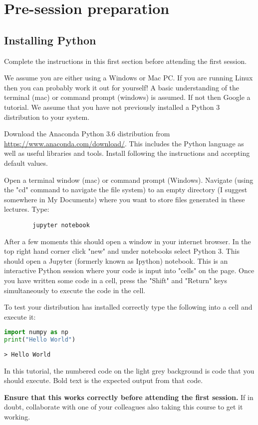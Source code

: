 \section{Pre-session preparation}
\subsection{Installing Python}
	Complete the instructions in this first section before attending the first session.
	
	We assume you are either using a Windows or Mac PC. If you are running Linux then you can probably work it out for yourself! A basic understanding of the terminal (mac) or command prompt (windows) is assumed. If not then Google a tutorial. We assume that you have not previously installed a Python 3 distribution to your system.
	
	Download the Anaconda Python 3.6 distribution from \url{https://www.anaconda.com/download/}. This includes the Python language as well as useful libraries and tools. Install following the instructions and accepting default values.

	Open a terminal window (mac) or command prompt (Windows). Navigate (using the "cd" command to navigate the file system) to an empty directory (I suggest somewhere in My Documents) where you want to store files generated in these lectures. Type:
	\begin{verbatim}
		jupyter notebook
	\end{verbatim}

After a few moments this should open a window in your internet browser. In the top right hand corner click "new" and under notebooks select Python 3. This should open a Jupyter (formerly known as Ipython) notebook. This is an interactive Python session where your code is input into "cells" on the page. Once you have written some code in a cell, press the "Shift" and "Return" keys simultaneously to execute the code in the cell.

To test your distribution has installed correctly type the following into a cell and execute it:

		\begin{lstlisting}[language=Python]
import numpy as np
print("Hello World")\end{lstlisting}
		\begin{verbatim}> Hello World\end{verbatim}
		
In this tutorial, the numbered code on the light grey background is code that you should execute. Bold text is the expected output from that code.

\textbf{Ensure that this works correctly before attending the first session.} If in doubt, collaborate with one of your colleagues also taking this course to get it working.